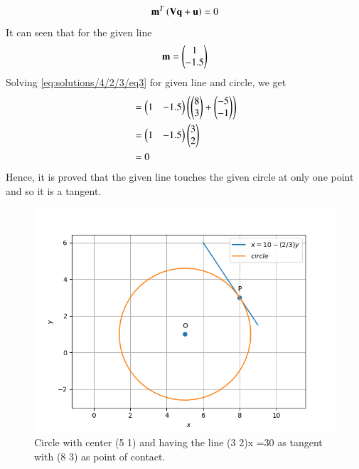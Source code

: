 \begin{align}
\mathbf{m}^T\left(\mathbf{V}\mathbf{q}+\mathbf{u}\right) = 0 \label{eq:solutions/4/2/3/eq3}
\end{align}
It can seen that for the given line
\begin{align}
\mathbf{m} = \begin{pmatrix}1 \\ -1.5\end{pmatrix} 
\end{align}
Solving \eqref{eq:solutions/4/2/3/eq3} for given line and circle, we get
\begin{align}
&= \begin{pmatrix}1 & -1.5\end{pmatrix}\left(\begin{pmatrix}8 \\ 3\end{pmatrix}+\begin{pmatrix}-5 \\ -1\end{pmatrix}\right) \\
&= \begin{pmatrix}1 & -1.5\end{pmatrix}\begin{pmatrix}3 \\ 2\end{pmatrix}\\
&= 0
\end{align}
Hence, it is proved that the given line touches the given circle at only one point and so it is a tangent.
\begin{figure}[!ht]
\centering
\includegraphics[width=\columnwidth]{./solutions/4/2/3/assignment_5_fig.png}
\caption{Circle with center (5 1) and having the line (3 2)x =30 as tangent with (8 3) as point of contact.}
\label{eq:solutions/4/2/3/Fig:Circle}
\end{figure}
